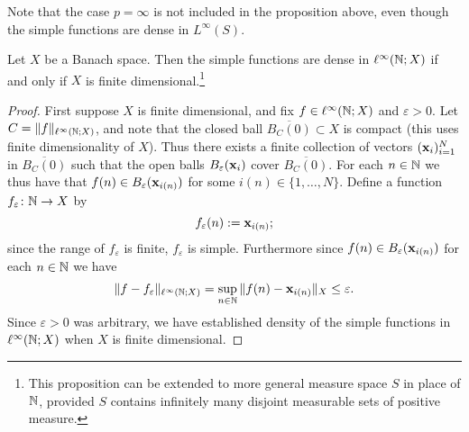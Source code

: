 Note that the case $p = \infty$ is not included in the proposition above, even though the simple functions are dense in $L^\infty(S)$.

\begin{prop}
  Let $X$ be a Banach space.
  Then the simple functions are dense in $\ell^\infty(\mathbb{N};X)$ if and only if $X$ is finite dimensional.\footnote{This proposition can be extended to more general measure space $S$ in place of $\mathbb{N}$, provided $S$ contains infinitely many disjoint measurable sets of positive measure.}
\end{prop}

\begin{proof}
  First suppose $X$ is finite dimensional, and fix $f \in \ell^\infty(\mathbb{N};X)$ and $\varepsilon > 0$.
  Let $C = \|f\|_{\ell^\infty(\mathbb{N};X)}$, and note that the closed ball $\overline{B_C(0)} \subset X$ is compact (this uses finite dimensionality of $X$).
  Thus there exists a finite collection of vectors $(\mathbf{x}_i)_{i=1}^N$ in $\overline{B_C(0)}$ such that the open balls $B_{\varepsilon}(\mathbf{x}_i)$ cover $\overline{B_C(0)}$.
  For each $n \in \mathbb{N}$ we thus have that $f(n) \in B_{\varepsilon}(\mathbf{x}_{i(n)})$ for some $i(n) \in \{1,\ldots,N\}$.
  Define a function $f_{\varepsilon} \colon \mathbb{N} \rightarrow X$ by
  \begin{equation*}
    f_{\varepsilon}(n) := \mathbf{x}_{i(n)};
  \end{equation*}
  since the range of $f_{\varepsilon}$ is finite, $f_{\varepsilon}$ is simple.
  Furthermore since $f(n) \in B_{\varepsilon}(\mathbf{x}_{i(n)})$ for each $n \in \mathbb{N}$ we have
  \begin{equation*}
    \|f - f_{\varepsilon}\|_{\ell^\infty(\mathbb{N};X)} = \sup_{n \in \mathbb{N}} \|f(n) - \mathbf{x}_{i(n)}\|_{X} \leq \varepsilon.
  \end{equation*}
  Since $\varepsilon > 0$ was arbitrary, we have established density of the simple functions in $\ell^\infty(\mathbb{N};X)$ when $X$ is finite dimensional.


\end{proof}
